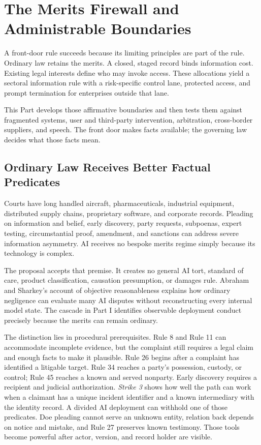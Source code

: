 \section{The Merits Firewall and Administrable Boundaries}
\label{sec:objections}

A front-door rule succeeds because its limiting principles are part of the rule. Ordinary law retains the merits. A closed, staged record binds information cost. Existing legal interests define who may invoke access. These allocations yield a sectoral information rule with a risk-specific control lane, protected access, and prompt termination for enterprises outside that lane.

This Part develops those affirmative boundaries and then tests them against fragmented systems, user and third-party intervention, arbitration, cross-border suppliers, and speech. The front door makes facts available; the governing law decides what those facts mean.

\subsection{Ordinary Law Receives Better Factual Predicates}

Courts have long handled aircraft, pharmaceuticals, industrial equipment, distributed supply chains, proprietary software, and corporate records. Pleading on information and belief, early discovery, party requests, subpoenas, expert testing, circumstantial proof, amendment, and sanctions can address severe information asymmetry. AI receives no bespoke merits regime simply because its technology is complex.

The proposal accepts that premise. It creates no general AI tort, standard of care, product classification, causation presumption, or damages rule. Abraham and Sharkey's account of objective reasonableness explains how ordinary negligence can evaluate many AI disputes without reconstructing every internal model state. The cascade in Part I identifies observable deployment conduct precisely because the merits can remain ordinary.

The distinction lies in procedural prerequisites. Rule 8 and Rule 11 can accommodate incomplete evidence, but the complaint still requires a legal claim and enough facts to make it plausible. Rule 26 begins after a complaint has identified a litigable target. Rule 34 reaches a party's possession, custody, or control; Rule 45 reaches a known and served nonparty. Early discovery requires a recipient and judicial authorization. \emph{Strike 3} shows how well the path can work when a claimant has a unique incident identifier and a known intermediary with the identity record. A divided AI deployment can withhold one of those predicates. Doe pleading cannot serve an unknown entity, relation back depends on notice and mistake, and Rule 27 preserves known testimony. Those tools become powerful after actor, version, and record holder are visible.

